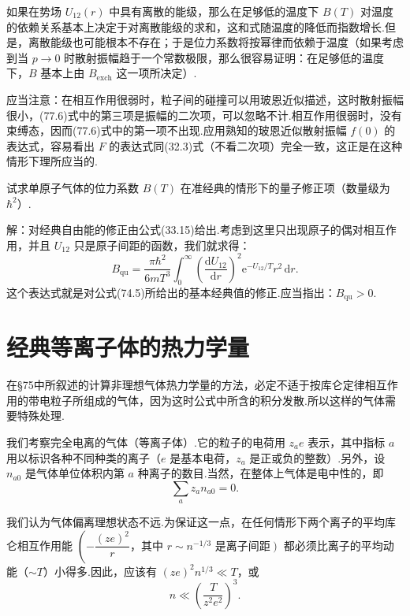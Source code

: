 如果在势场 $U_{12}(r)$ 中具有离散的能级，那么在足够低的温度下 $B(T)$ 对温度的依赖关系基本上决定于对离散能级的求和，这和式随温度的降低而指数增长.但是，离散能级也可能根本不存在；于是位力系数将按幂律而依赖于温度（如果考虑到当 $p\to0$ 时散射振幅趋于一个常数极限，那么很容易证明：在足够低的温度下，$B$ 基本上由 $B_{\mathrm{exch}}$ 这一项所决定）.

应当注意：在相互作用很弱时，粒子间的碰撞可以用玻恩近似描述，这时散射振幅很小，(77.6)式中的第三项是振幅的二次项，可以忽略不计.相互作用很弱时，没有束缚态，因而(77.6)式中的第一项不出现.应用熟知的玻恩近似散射振幅 $f(0)$ 的表达式，容易看出 $F$ 的表达式同(32.3)式（不看二次项）完全一致，这正是在这种情形下理所应当的.

\begin{xiti}

\quad 试求单原子气体的位力系数 $B(T)$ 在准经典的情形下的量子修正项（数量级为 $\hbar^2$）.

解：对经典自由能的修正由公式(33.15)给出.考虑到这里只出现原子的偶对相互作用，并且 $U_{12}$ 只是原子间距的函数，我们就求得：
\begin{equation*}
  B_{\mathrm{qu}}=\frac{\pi\hbar^2}{6mT^3}\int_0^{\infty}
  \left(\frac{\mathrm{d}U_{12}}{\mathrm{d}r}\right)^2
  \mathrm{e}^{-U_{12}/T}r^2\,\mathrm{d}r.
\end{equation*}
这个表达式就是对公式(74.5)所给出的基本经典值的修正.应当指出：$B_{\mathrm{qu}}>0$.

\end{xiti}

\section{经典等离子体的热力学量}

在§75中所叙述的计算非理想气体热力学量的方法，必定不适于按库仑定律相互作用的带电粒子所组成的气体，因为这时公式中所含的积分发散.所以这样的气体需要特殊处理.

我们考察完全电离的气体（等离子体）.它的粒子的电荷用 $z_ae$ 表示，其中指标 $a$ 用以标识各种不同种类的离子（$e$ 是基本电荷，$z_a$ 是正或负的整数）.另外，设 $n_{a0}$ 是气体单位体积内第 $a$ 种离子的数目.当然，在整体上气体是电中性的，即
\begin{equation}
  \sum_az_an_{a0}=0.
\end{equation}

我们认为气体偏离理想状态不远.为保证这一点，在任何情形下两个离子的平均库仑相互作用能 $\left(-\dfrac{(ze)^2}{r}\right.$，其中 $r\sim n^{-1/3}$ 是离子间距$\left.\right)$ 都必须比离子的平均动能（$\sim T$）小得多.因此，应该有 $(ze)^2n^{1/3}\ll T$，或
\begin{equation}
  n\ll\left(\frac{T}{z^2e^2}\right)^3.
\end{equation}

